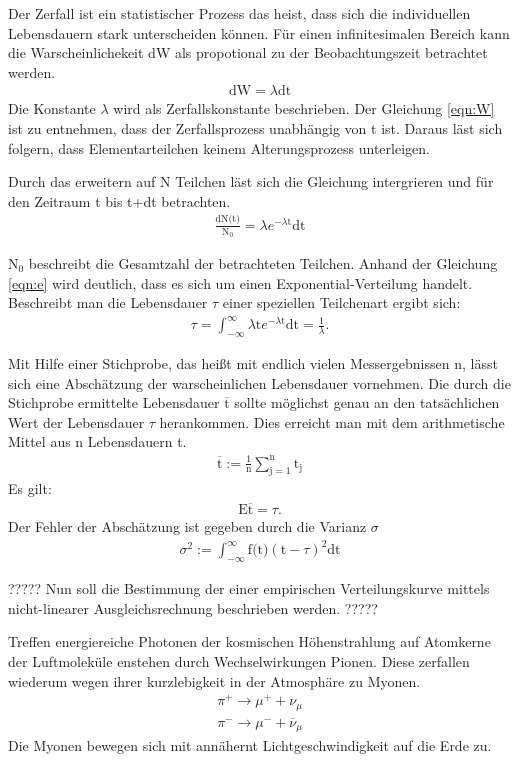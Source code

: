 Der Zerfall ist ein statistischer Prozess das heist, dass sich die individuellen Lebensdauern stark unterscheiden können.
Für einen infinitesimalen Bereich kann die Warscheinlichekeit dW als propotional zu der Beobachtungszeit betrachtet werden.
\begin{align}
  \text{dW}=\lambda \text{dt}
  \label{eqn:W}
\end{align}
Die Konstante $\lambda$ wird als Zerfallskonstante beschrieben.
Der Gleichung \ref{eqn:W} ist zu entnehmen, dass der Zerfallsprozess unabhängig von t ist.
Daraus läst sich folgern, dass Elementarteilchen keinem Alterungsprozess unterleigen.

Durch das erweitern auf N Teilchen läst sich die Gleichung intergrieren und für den Zeitraum t bis t+dt betrachten.
\begin{align}
  \frac{\text{dN(t)}}{\text{N}_0}=\lambda e^{-\lambda \text{t}} \text{dt}
  \label{eqn:e}
\end{align}



$\text{N}_0$ beschreibt die Gesamtzahl der betrachteten Teilchen.
Anhand der Gleichung \ref{eqn:e} wird deutlich, dass es sich um einen Exponential-Verteilung handelt.
Beschreibt man die Lebensdauer $\tau$ einer speziellen Teilchenart ergibt sich:
\begin{align*}
  \tau=\int_{-\infty}^{\infty}\lambda \text{t} e^{-\lambda \text{t}}\text{dt}=\frac{1}{\lambda}.
\end{align*}

Mit Hilfe einer Stichprobe, das heißt mit endlich vielen Messergebnissen n, lässt sich eine Abschätzung der warscheinlichen Lebensdauer vornehmen.
Die durch die Stichprobe ermittelte Lebensdauer $\overline{\text{t}}$ sollte möglichst genau an den tatsächlichen Wert der Lebensdauer $\tau$ herankommen.
Dies erreicht man mit dem arithmetische Mittel aus n Lebensdauern t.
\begin{align*}
  \overline{\text{t}}:=\frac{1}{\text{n}}\sum_{\text{j}=1}^\text{n}\text{t}_\text{j}
\end{align*}
Es gilt:
\begin{align*}
  \text{E}\overline{\text{t}}=\tau.
\end{align*}
Der Fehler der Abschätzung ist gegeben durch die Varianz $\sigma$
\begin{align*}
  \sigma^2:=\int_{-\infty}^{\infty}\text{f(t)}(\text{t}-\tau)^2\text{dt}
\end{align*}

?????
Nun soll die Bestimmung der einer empirischen Verteilungskurve mittels nicht-linearer Ausgleichsrechnung beschrieben werden.
?????

Treffen energiereiche Photonen der kosmischen Höhenstrahlung auf Atomkerne der Luftmoleküle enstehen durch Wechselwirkungen
Pionen.
Diese zerfallen wiederum wegen ihrer kurzlebigkeit in der Atmosphäre zu Myonen.
\begin{align*}
  \pi^+ \rightarrow \mu^++\nu_\mu\\
  \pi^- \rightarrow \mu^-+\overline{\nu}_\mu
\end{align*}
Die Myonen bewegen sich mit annähernt Lichtgeschwindigkeit auf die Erde zu.
